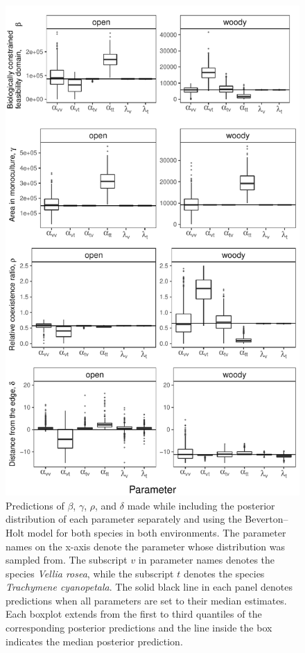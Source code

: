\begin{refsection}
\begin{figure}[H]
  \centerline{\includegraphics[width=.95\textwidth]{figures/chapter3_fig5.pdf}}
  \caption{Predictions of $\beta$, $\gamma$, $\rho$, and $\delta$  made while including the posterior distribution of each parameter separately and using the Beverton--Holt model for both species in both environments. The parameter names on the x-axis denote the parameter whose distribution was sampled from. The subscript $v$ in parameter names denotes the species \textit{Vellia rosea}, while the subscript $t$ denotes the species \textit{Trachymene cyanopetala}. The solid black line in each panel denotes predictions when all parameters are set to their median estimates. Each boxplot extends from the first to third quantiles of the corresponding posterior predictions and the line inside the box indicates the median posterior prediction.   }
    \label{fig:params}
\end{figure}


\end{refsection}

